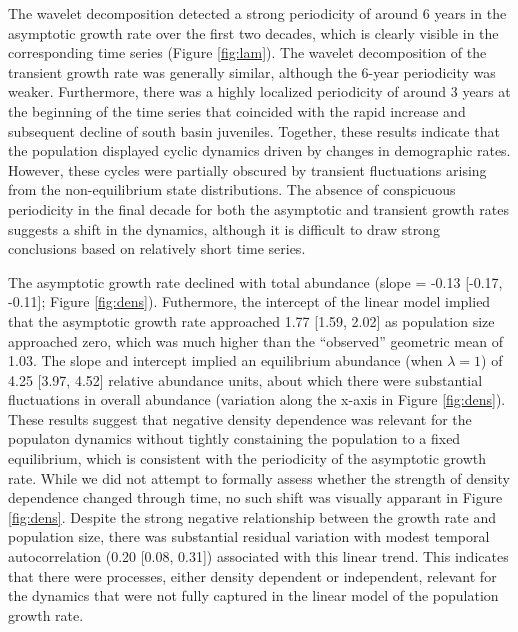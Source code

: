 The wavelet decomposition detected a strong periodicity of around 6 years
in the asymptotic growth rate over the first two decades, 
which is clearly visible in the corresponding time series (Figure \ref{fig:lam}).
The wavelet decomposition of the transient growth rate was generally similar,
although the 6-year periodicity was weaker.
Furthermore, there was a highly localized periodicity of around 3 years 
at the beginning of the time series 
that coincided with the rapid increase and subsequent decline of south basin juveniles.
Together, these results indicate that the population displayed cyclic dynamics 
driven by changes in demographic rates.
However, these cycles were partially obscured by transient fluctuations arising 
from the non-equilibrium state distributions.
The absence of conspicuous periodicity in the final decade
for both the asymptotic and transient growth rates 
suggests a shift in the dynamics, 
although it is difficult to draw strong conclusions 
based on relatively short time series.

The asymptotic growth rate declined with total abundance
(slope = -0.13 [-0.17, -0.11]; Figure \ref{fig:dens}).
Futhermore, 
the intercept of the linear model implied that 
the asymptotic growth rate approached 1.77 [1.59, 2.02] 
as population size approached zero,
which was much higher than the ``observed'' geometric mean of 1.03.
The slope and intercept implied an equilibrium abundance (when $\lambda=1$)
of 4.25 [3.97, 4.52] relative abundance units,
about which there were substantial fluctuations in overall abundance 
(variation along the x-axis in Figure \ref{fig:dens}).
These results suggest that negative density dependence was relevant for the populaton
dynamics without tightly constaining the population to a fixed equilibrium,
which is consistent with the periodicity of the asymptotic growth rate.
While we did not attempt to formally assess whether the strength of density dependence
changed through time,
no such shift was visually apparant in Figure \ref{fig:dens}.
Despite the strong negative relationship between the growth rate and population size, 
there was substantial residual variation with modest
temporal autocorrelation (0.20 [0.08, 0.31]) associated with this linear trend.
This indicates that there were processes, either density dependent or independent,
relevant for the dynamics 
that were not fully captured in the linear model of the population growth rate.

